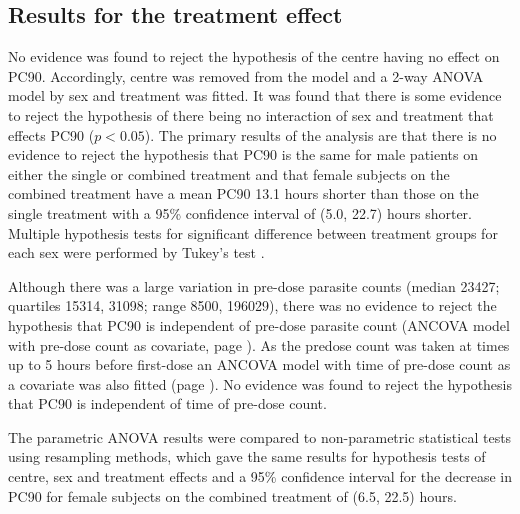 \subsection{Results for the treatment effect}
No evidence was found to reject the hypothesis of the centre having no effect on PC90. Accordingly, centre was removed from the model and a 2-way ANOVA model by sex and treatment was fitted. It was found that there is some evidence to reject the hypothesis of there being no interaction of sex and treatment that effects PC90 ($p<0.05$). The primary results of the analysis are that there is no evidence to reject the hypothesis that PC90 is the same for male patients on either the single or combined treatment and that female subjects on the combined treatment have a mean PC90 13.1 hours shorter than those on the single treatment with a 95\% confidence interval of (5.0, 22.7) hours shorter. Multiple hypothesis tests for significant difference between treatment groups for each sex were performed by Tukey's test \cite{montgomery}.

Although there was a large variation in pre-dose parasite counts (median 23427; quartiles 15314, 31098; range 8500, 196029), there was no evidence to reject the hypothesis that PC90 is independent of pre-dose parasite count (ANCOVA model with pre-dose count as covariate, page \pageref{sec:predoseancova}). As the predose count was taken at times up to 5 hours before first-dose an ANCOVA model with time of pre-dose count as a covariate was also fitted (page \pageref{sec:pretimeancova}). No evidence was found to reject the hypothesis that PC90 is independent of time of pre-dose count. 

The parametric ANOVA results were compared to non-parametric statistical tests using resampling methods, which gave the same results for hypothesis tests of centre, sex and treatment effects and a 95\% confidence interval for the decrease in PC90 for female subjects on the combined treatment of (6.5, 22.5) hours.


